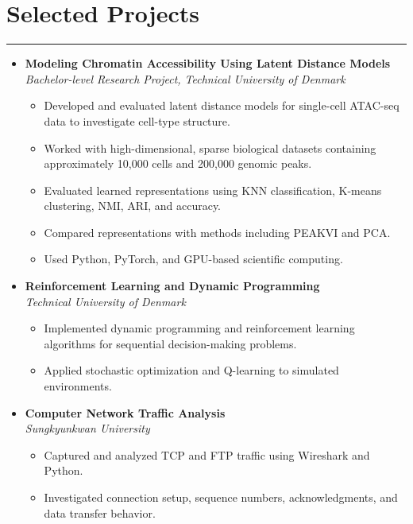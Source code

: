 \documentclass[letterpaper,10pt]{article}
\begin{document}
\section*{Selected Projects}
\hrule
\vspace{5pt}

\begin{itemize}

    \item[]
    \textbf{Modeling Chromatin Accessibility
    Using Latent Distance Models}\\
    \textit{Bachelor-level Research Project,
    Technical University of Denmark}

    \begin{itemize}
        \item Developed and evaluated latent
        distance models for single-cell ATAC-seq
        data to investigate cell-type structure.
        \item Worked with high-dimensional,
        sparse biological datasets containing
        approximately 10,000 cells and
        200,000 genomic peaks.
        \item Evaluated learned representations
        using KNN classification, K-means
        clustering, NMI, ARI, and accuracy.
        \item Compared representations with
        methods including PEAKVI and PCA.
        \item Used Python, PyTorch, and
        GPU-based scientific computing.
    \end{itemize}

    \vspace{5pt}

    \item[]
    \textbf{Reinforcement Learning and
    Dynamic Programming}\\
    \textit{Technical University of Denmark}

    \begin{itemize}
        \item Implemented dynamic programming
        and reinforcement learning algorithms
        for sequential decision-making problems.
        \item Applied stochastic optimization
        and Q-learning to simulated environments.
    \end{itemize}

    \vspace{5pt}

    \item[]
    \textbf{Computer Network Traffic Analysis}\\
    \textit{Sungkyunkwan University}

    \begin{itemize}
        \item Captured and analyzed TCP and FTP
        traffic using Wireshark and Python.
        \item Investigated connection setup,
        sequence numbers, acknowledgments,
        and data transfer behavior.
    \end{itemize}

\end{itemize}
\newpage
\end{document}
